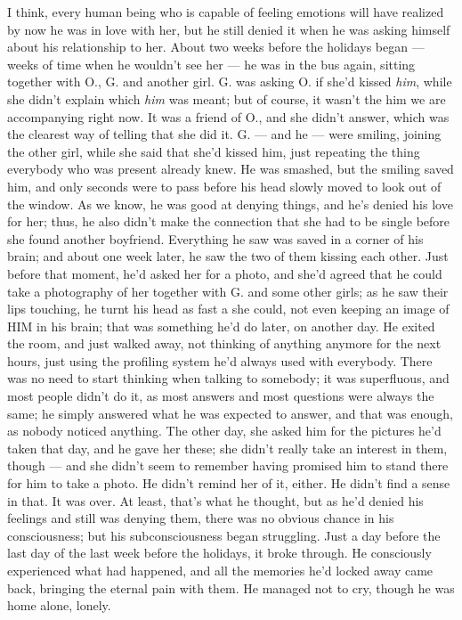 I think, every human being who is capable of feeling emotions will have realized by now he was in love with her, but he still denied it when he was asking himself about his relationship to her. 
About two weeks before the holidays began --- weeks of time when he wouldn't see her --- he was in the bus again, sitting together with O., G. and another girl. G. was asking O. if she'd kissed \emph{him}, while she didn't explain which \emph{him} was meant; but of course, it wasn't the him we are accompanying right now. It was a friend of O., and she didn't answer, which was the clearest way of telling that she did it. G. --- and he --- were smiling, joining the other girl, while she said that she'd kissed him, just repeating the thing everybody who was present already knew. 
He was smashed, but the smiling saved him, and only seconds were to pass before his head slowly moved to look out of the window. 
As we know, he was good at denying things, and he's denied his love for her; thus, he also didn't make the connection that she had to be single before she found another boyfriend. Everything he saw was saved in a corner of his brain; and about one week later, he saw the two of them kissing each other. Just before that moment, he'd asked her for a photo, and she'd agreed that he could take a photography of her together with G. and some other girls; as he saw their lips touching, he turnt his head as fast a she could, not even keeping an image of HIM in his brain; that was something he'd do later, on another day. 
He exited the room, and just walked away, not thinking of anything anymore for the next hours, just using the profiling system he'd always used with everybody. There was no need to start thinking when talking to somebody; it was superfluous, and most people didn't do it, as most answers and most questions were always the same; he simply answered what he was expected to answer, and that was enough, as nobody noticed anything. 
The other day, she asked him for the pictures he'd taken that day, and he gave her these; she didn't really take an interest in them, though --- and she didn't seem to remember having promised him to stand there for him to take a photo. 
He didn't remind her of it, either. He didn't find a sense in that. 
It was over. 
At least, that's what he thought, but as he'd denied his feelings and still was denying them, there was no obvious chance in his consciousness; but his subconsciousness began struggling. 
Just a day before the last day of the last week before the holidays, it broke through. 
He consciously experienced what had happened, and all the memories he'd locked away came back, bringing the eternal pain with them. He managed not to cry, though he was home alone, lonely. 
